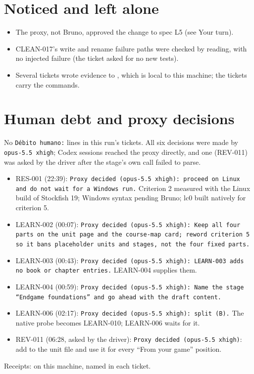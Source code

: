 \documentclass[11pt,a4paper]{article}
\begin{document}
\section*{Noticed and left alone}

\begin{itemize}
  \item The proxy, not Bruno, approved the change to spec L5 (see Your turn).
  \item CLEAN-017's write and rename failure paths were checked by reading, with no injected
        failure (the ticket asked for no new tests).
  \item Several tickets wrote evidence to , which is local to
        this machine; the tickets carry the commands.
\end{itemize}

\section*{Human debt and proxy decisions}

No \texttt{Débito humano:} lines in this run's tickets. All six decisions were made by
\texttt{opus-5.5 xhigh}; Codex sessions reached the proxy directly, and one (REV-011) was asked by
the driver after the stage's own call failed to parse.
\begin{itemize}
  \item RES-001 (22:39): \texttt{Proxy decided (opus-5.5 xhigh): proceed on Linux and do not wait for
        a Windows run.} Criterion 2 measured with the Linux build of Stockfish 19; Windows syntax
        pending Bruno; lc0 built natively for criterion 5.
  \item LEARN-002 (00:07): \texttt{Proxy decided (opus-5.5 xhigh): Keep all four parts on the unit page
        and the course-map card; reword criterion 5 so it bans placeholder units and stages, not the
        four fixed parts.}
  \item LEARN-003 (00:43): \texttt{Proxy decided (opus-5.5 xhigh): LEARN-003 adds no book or chapter
        entries.} LEARN-004 supplies them.
  \item LEARN-004 (00:59): \texttt{Proxy decided (opus-5.5 xhigh): Name the stage ``Endgame
        foundations'' and go ahead with the draft content.}
  \item LEARN-006 (02:17): \texttt{Proxy decided (opus-5.5 xhigh): split (B).} The native probe
        becomes LEARN-010; LEARN-006 waits for it.
  \item REV-011 (06:28, asked by the driver): \texttt{Proxy decided (opus-5.5 xhigh)}: add  to the unit file
        and use it for every ``From your game'' position.
\end{itemize}
Receipts:  on this machine, named in each ticket.
\end{document}
